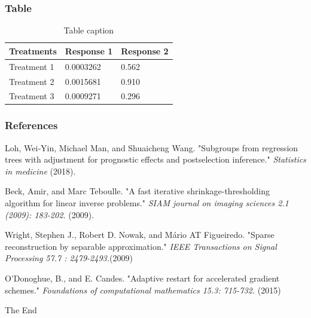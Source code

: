 \documentclass{beamer}
\begin{document}
    
    
    
    
  
    \begin{frame}
    \frametitle{Table}
    \begin{table}
    \begin{tabular}{l l l}
    \toprule
    \textbf{Treatments} & \textbf{Response 1} & \textbf{Response 2}\\
    \midrule
    Treatment 1 & 0.0003262 & 0.562 \\
    Treatment 2 & 0.0015681 & 0.910 \\
    Treatment 3 & 0.0009271 & 0.296 \\
    \bottomrule
    \end{tabular}
    \caption{Table caption}
    \end{table}
    \end{frame}
    
    
  
    
    
    
    
    
    \begin{frame}
    \frametitle{References}
    \footnotesize{
    \begin{thebibliography}{99} %
     Loh, Wei‐Yin, Michael Man, and Shuaicheng Wang.  
    \newblock "Subgroups from regression trees with adjustment for prognostic effects and postselection inference."
    \newblock \emph{Statistics in medicine} (2018).
    
     Beck, Amir, and Marc Teboulle.
    \newblock "A fast iterative shrinkage-thresholding algorithm for linear inverse problems."
    \newblock \emph{ SIAM journal on imaging sciences 2.1 (2009): 183-202.  } (2009).
    
     Wright, Stephen J., Robert D. Nowak, and Mário AT Figueiredo.
     \newblock "Sparse reconstruction by separable approximation." 
    \newblock \emph{IEEE Transactions on Signal Processing 57.7 : 2479-2493.}(2009)
    
     O’Donoghue, B., and E. Candes. 
    \newblock  "Adaptive restart for accelerated gradient schemes." 
    \newblock \emph{Foundations of computational mathematics 15.3: 715-732.} (2015)
    
    \end{thebibliography}
    
    }
    \end{frame}
    
    
    \begin{frame}
    \Huge{\centerline{The End}}
    \end{frame}
    
    
    
\end{document}
